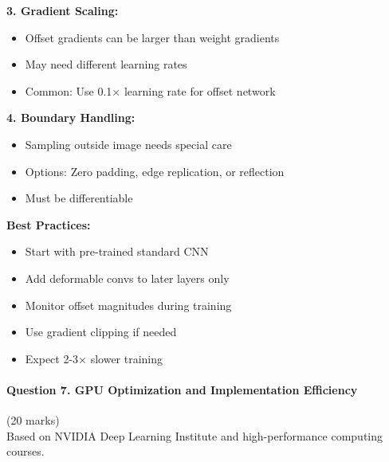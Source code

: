 \documentclass[12pt]{article}
\begin{document}
\begin{enumerate}[(a)]
{{    \textbf{3. Gradient Scaling:}
    \begin{itemize}
        \item Offset gradients can be larger than weight gradients
        \item May need different learning rates
        \item Common: Use 0.1× learning rate for offset network
    \end{itemize}
    
    \textbf{4. Boundary Handling:}
    \begin{itemize}
        \item Sampling outside image needs special care
        \item Options: Zero padding, edge replication, or reflection
        \item Must be differentiable
    \end{itemize}
    
    \textbf{Best Practices:}
    \begin{itemize}
        \item Start with pre-trained standard CNN
        \item Add deformable convs to later layers only
        \item Monitor offset magnitudes during training
        \item Use gradient clipping if needed
        \item Expect 2-3× slower training
    \end{itemize}
    }
    }
\end{enumerate}

\newpage
\paragraph{Question 7. GPU Optimization and Implementation Efficiency}{{\hfill (20 marks)}}\\
Based on NVIDIA Deep Learning Institute and high-performance computing courses.
\end{document}

